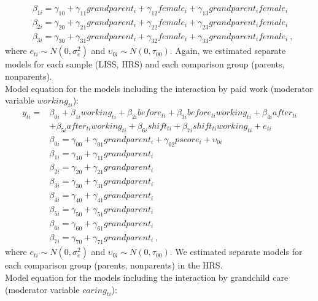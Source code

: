 \documentclass[
  english,
  man, noextraspace]{apa7}
\begin{document}
\begin{appendix}
\begin{equation}
\begin{split}
& \beta_{1i} = \gamma_{10} + \gamma_{11}grandparent_i + \gamma_{12}female_i + \gamma_{13}grandparent_{i}female_{i} \\
& \beta_{2i} = \gamma_{20} + \gamma_{21}grandparent_i + \gamma_{22}female_i + \gamma_{23}grandparent_{i}female_{i} \\
& \beta_{3i} = \gamma_{30} + \gamma_{31}grandparent_i + \gamma_{32}female_i + \gamma_{33}grandparent_{i}female_{i}\ ,
\end{split}
\label{eq:mlm2}
\end{equation} where \(e_{ti} \sim N(0, \sigma_e^2)\) and
\(\upsilon_{0i} \sim N(0, \tau_{00})\). Again, we estimated separate
models for each sample (LISS, HRS) and each comparison group (parents,
nonparents).\\
Model equation for the models including the interaction by paid work
(moderator variable \(working_{ti}\)): \begin{equation}
\begin{split}
y_{ti} =& \beta_{0i} + \beta_{1i}working_{ti} + \beta_{2i}before_{ti} + \beta_{3i}before_{ti}working_{ti} + \beta_{4i}after_{ti} \\
& + \beta_{5i}after_{ti}working_{ti} + \beta_{6i}shift_{ti} + \beta_{7i}shift_{ti}working_{ti} + e_{ti} \\
& \beta_{0i} = \gamma_{00} + \gamma_{01}grandparent_i + \gamma_{02}pscore_i + \upsilon_{0i} \\
& \beta_{1i} = \gamma_{10} + \gamma_{11}grandparent_i \\
& \beta_{2i} = \gamma_{20} + \gamma_{21}grandparent_i \\
& \beta_{3i} = \gamma_{30} + \gamma_{31}grandparent_i \\
& \beta_{4i} = \gamma_{40} + \gamma_{41}grandparent_i \\
& \beta_{5i} = \gamma_{50} + \gamma_{51}grandparent_i \\
& \beta_{6i} = \gamma_{60} + \gamma_{61}grandparent_i \\
& \beta_{7i} = \gamma_{70} + \gamma_{71}grandparent_i\ ,
\end{split}
\label{eq:mlm3}
\end{equation} where \(e_{ti} \sim N(0, \sigma_e^2)\) and
\(\upsilon_{0i} \sim N(0, \tau_{00})\). We estimated separate models for
each comparison group (parents, nonparents) in the HRS.\\
Model equation for the models including the interaction by grandchild
care (moderator variable \(caring_{ti}\)): \begin{equation}

\end{equation}
\end{appendix}
\end{document}
